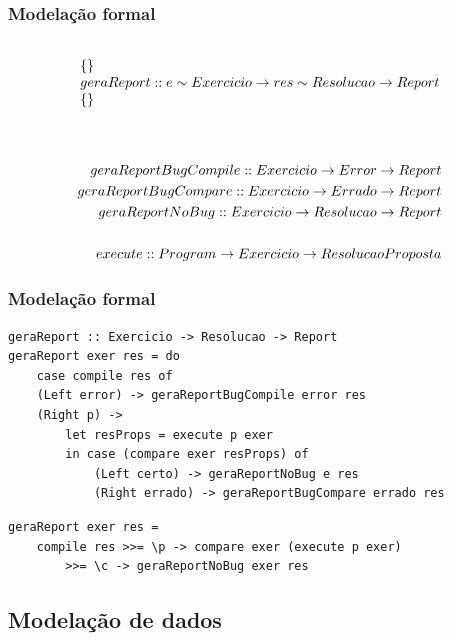 \documentclass{beamer}
\begin{document}
\begin{frame} \frametitle{Modelação formal}
\begin{displaymath}
\begin{array}{l}
\prop
{ }
{geraReport :: e \unif Exercicio \rarrow res \unif Resolucao \rarrow Report}
{ }
\end{array}
\end{displaymath}
\\
\begin{eqnarray*}
geraReportBugCompile :: Exercicio \rightarrow Error \rightarrow Report\\
geraReportBugCompare :: Exercicio \rightarrow Errado \rightarrow Report\\
geraReportNoBug :: Exercicio \rightarrow Resolucao \rightarrow Report\\
\\
execute :: Program \rightarrow Exercicio \rightarrow ResolucaoProposta\\
\end{eqnarray*}
\end{frame}

\begin{frame}[fragile] \frametitle{Modelação formal}
\begin{lstlisting}[language=HaskellUlisses]
geraReport :: Exercicio -> Resolucao -> Report
geraReport exer res = do
    case compile res of
    (Left error) -> geraReportBugCompile error res
    (Right p) ->
        let resProps = execute p exer
        in case (compare exer resProps) of
            (Left certo) -> geraReportNoBug e res
            (Right errado) -> geraReportBugCompare errado res
\end{lstlisting}

\begin{lstlisting}[language=HaskellUlisses]
geraReport exer res =
    compile res >>= \p -> compare exer (execute p exer)
        >>= \c -> geraReportNoBug exer res
\end{lstlisting}
\end{frame}

\subsection{Modelação de dados}
\end{document}
